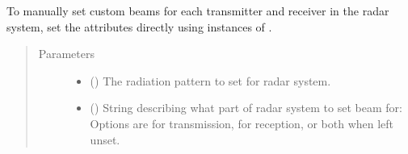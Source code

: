 \documentclass[letterpaper,10pt,english]{sphinxmanual}
\begin{document}
\begin{fulllineitems}
\begin{fulllineitems}
To manually set custom beams for each transmitter and receiver in the radar system, set the attributes directly using instances of {\hyperref[\detokenize{modules/antenna:antenna.BeamPattern}]{}}.
\begin{quote}\begin{description}
\item[{Parameters}] \leavevmode\begin{itemize}
\item {} 
 ({\hyperref[\detokenize{modules/antenna:antenna.BeamPattern}]{}}) \textendash{} The radiation pattern to set for radar system.

\item {} 
 () \textendash{} String describing what part of radar system to set beam for: Options are  for transmission,  for reception, or both when left unset.

\end{itemize}

\end{description}\end{quote}


%
\begin{sphinxVerbatim}[commandchars=\\\{\}]
   
   

            
\end{sphinxVerbatim}


\end{fulllineitems}
\end{fulllineitems}
\end{document}
